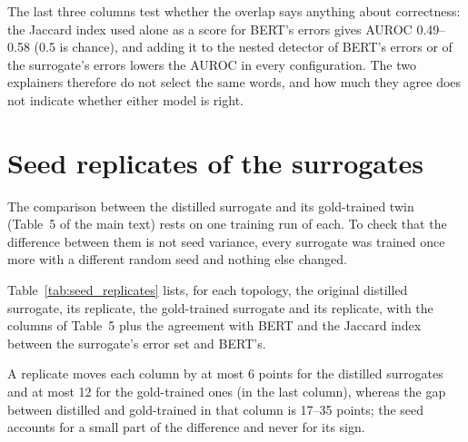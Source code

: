 \documentclass[3p,times,10pt,nopreprintline]{elsarticle}
\begin{document}
The last three columns test whether the overlap says anything about correctness: the Jaccard index used alone as a score for BERT's errors gives AUROC 0.49--0.58 (0.5 is chance), and adding it to the nested detector of BERT's errors or of the surrogate's errors lowers the AUROC in every configuration. The two explainers therefore do not select the same words, and how much they agree does not indicate whether either model is right.


\begin{table}[H]
\centering
\scriptsize
\setlength{\tabcolsep}{4pt}
\caption{Overlap between the words highlighted by the graph explainer and by TokenSHAP at the 20\% budget, per instance: mean Jaccard index, mean Spearman correlation of the shared words, and share of instances with the same top-1 word. AUROC: the Jaccard index used alone as a score for BERT's gold-label errors. \(\Delta\)AUROC: paired-bootstrap gain of adding the overlap to the nested detector of BERT's errors and of the surrogate's errors, with 95\% intervals.}
\label{tab:overlap}
\end{table}

\section{Seed replicates of the surrogates}

The comparison between the distilled surrogate and its gold-trained twin (Table~5 of the main text) rests on one training run of each. To check that the difference between them is not seed variance, every surrogate was trained once more with a different random seed and nothing else changed.

Table~\ref{tab:seed_replicates} lists, for each topology, the original distilled surrogate, its replicate, the gold-trained surrogate and its replicate, with the columns of Table~5 plus the agreement with BERT and the Jaccard index between the surrogate's error set and BERT's.

A replicate moves each column by at most 6 points for the distilled surrogates and at most 12 for the gold-trained ones (in the last column), whereas the gap between distilled and gold-trained in that column is 17--35 points; the seed accounts for a small part of the difference and never for its sign.
\end{document}

